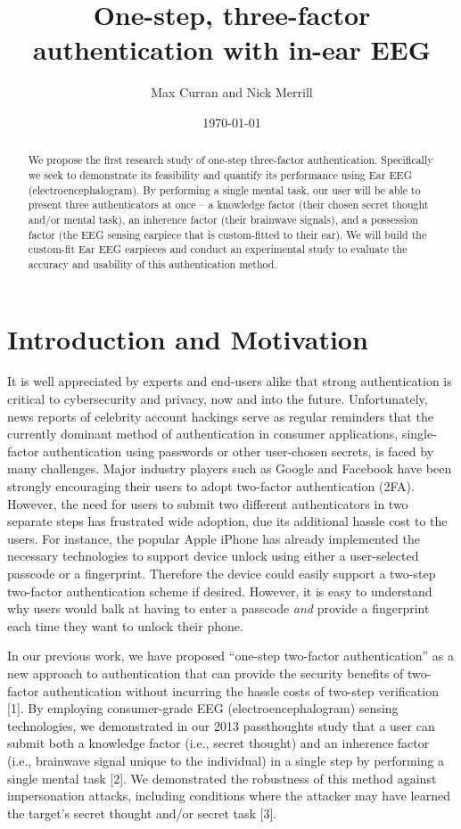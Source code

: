 \documentclass[11pt]{article}
\author{Max Curran and Nick Merrill}
\date{\today}
\title{One-step, three-factor authentication with in-ear EEG}
\begin{document}
\maketitle
\begin{abstract}
We propose the first research study of one-step three-factor authentication.
Specifically we seek to demonstrate its feasibility and quantify its performance
using Ear EEG (electroencephalogram). By performing a single mental task, our
user will be able to present three authenticators at once – a knowledge factor
(their chosen secret thought and/or mental task), an inherence factor (their
brainwave signals), and a possession factor (the EEG sensing earpiece that is
custom-fitted to their ear). We will build the custom-fit Ear EEG earpieces and
conduct an experimental study to evaluate the accuracy and usability of this
authentication method.
\end{abstract}
\section{Introduction and Motivation}
\label{sec:org557c212}

It is well appreciated by experts and end-users alike that strong authentication is
critical to cybersecurity and privacy, now and into the future. Unfortunately,
news reports of celebrity account hackings serve as regular reminders that
the currently dominant method of authentication in consumer applications, 
single-factor authentication using passwords or other user-chosen secrets, 
is faced by many challenges. Major industry players such as Google and
Facebook have been strongly encouraging their users to adopt two-factor
authentication (2FA). However, the need for users to submit two different 
authenticators in two separate steps has frustrated wide adoption, 
due its additional hassle cost to the users. For instance, the popular Apple
iPhone has already implemented the necessary technologies to support device
unlock using either a user-selected passcode or a fingerprint. Therefore the
device could easily support a two-step two-factor authentication scheme if
desired. However, it is easy to understand why users would balk at having to
enter a passcode \emph{and} provide a fingerprint each time they want to unlock their phone.

In our previous work, we have proposed “one-step two-factor authentication” as a
new approach to authentication that can provide the security benefits of two-
factor authentication without incurring the hassle costs of two-step verification [1].
By employing consumer-grade EEG (electroencephalogram) sensing
technologies, we demonstrated in our 2013 passthoughts study that a user can
submit both a knowledge factor (i.e., secret thought) and an inherence factor
(i.e., brainwave signal unique to the individual) in a single step by performing a
single mental task [2]. We demonstrated the robustness of this method against
impersonation attacks, including conditions where the attacker may have learned
the target’s secret thought and/or secret task [3].
\end{document}

